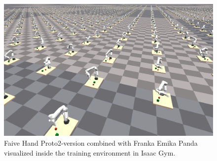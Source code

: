\documentclass[a4paper]{article}
\begin{document}
\newpage

\begin{figure}[!hb]
    \centering
    \includegraphics[scale=0.3]{images/summary.png}
    \caption{Faive Hand Proto2-version combined with Franka Emika Panda visualized inside the training environment in Isaac Gym.}
    \label{IG}
\end{figure}
\end{document}
